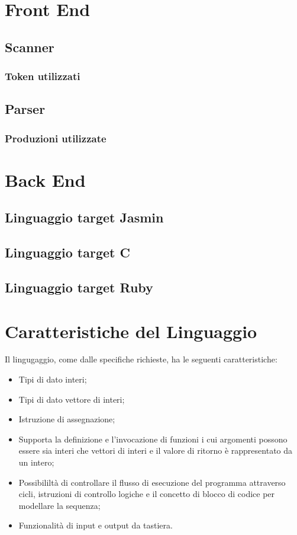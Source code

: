 \documentclass[11pt, a4paper, twoside, notitlepage]{report}
\begin{document}
\onehalfspacing

\setcounter{page}{1}
\setcounter{tocdepth}{3}%
\tableofcontents

\chapter{Front End}

\section{Scanner}
\subsection{Token utilizzati} 
\section{Parser}
\subsection{Produzioni utilizzate}

\chapter{Back End}
\label{back_end}
\section{Linguaggio target Jasmin}
\section{Linguaggio target C}
\section{Linguaggio target Ruby}

\chapter{Caratteristiche del Linguaggio}
Il lingugaggio, come dalle specifiche richieste, ha le seguenti caratteristiche:
\begin{itemize}
  \item Tipi di dato interi;
  \item Tipi di dato vettore di interi;
  \item Istruzione di assegnazione;
  \item Supporta la definizione e l'invocazione di funzioni i cui argomenti
  possono essere sia interi che vettori di interi e il valore di ritorno è
  rappresentato da un intero;
  \item Possibililtà di controllare il flusso di esecuzione del programma
  attraverso cicli, istruzioni di controllo logiche e il concetto di blocco di
  codice per modellare la sequenza;
  \item Funzionalità di input e output da tastiera.
\end{itemize}
\end{document}

